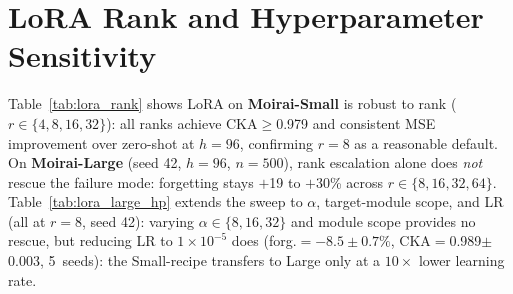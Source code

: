 \begin{table}[ht]
\centering
\caption{\textbf{Batch 3 of the pre-registered prospective test: the fitted
gate, graded on cells whose outcomes did not exist when it was frozen.}
gate$_\text{val}$ is the corrected selection-split ridge gate of
\S\ref{sec:forecasting}, frozen in the registration; ``pred.'' is the registered
gate rule at the $0.20$ operating point.  $\Delta_\text{FT}$ and
$\Delta_\text{frozen}$ are B$-$ZS and D$-$ZS in percent of zero-shot loss, with
$95\%$ intervals propagating the zero-shot reference's own error; ``Degr.?''
applies the registered interval rule.  The $\denc$ call is BH-adjusted within this
batch only.  A tenth registered cell (Moirai-Large/ETTm2 $h{=}96$, gate $-0.278$)
was deferred for the submission deadline and is disclosed in
Appendix~\ref{app:prospective3}.}
\label{tab:prospective3}

\end{table}

\section{LoRA Rank and Hyperparameter Sensitivity}
\label{app:lora_rank}

Table~\ref{tab:lora_rank} shows LoRA on \textbf{Moirai-Small} is robust to
rank ($r \in \{4, 8, 16, 32\}$): all ranks achieve CKA$\geq$0.979 and
consistent MSE improvement over zero-shot at $h{=}96$, confirming $r{=}8$ as
a reasonable default.
On \textbf{Moirai-Large} (seed 42, $h{=}96$, $n{=}500$), rank escalation
alone does \emph{not} rescue the failure mode: forgetting stays $+$19 to
$+$30\% across $r \in \{8, 16, 32, 64\}$.
Table~\ref{tab:lora_large_hp} extends the sweep to $\alpha$, target-module
scope, and LR (all at $r{=}8$, seed 42): varying $\alpha \in \{8,16,32\}$ and
module scope provides no rescue, but reducing LR to $1{\times}10^{-5}$ does
(forg.$=-8.5\pm0.7\%$, CKA$=$0.989$\pm$0.003, 5~seeds): the Small-recipe
transfers to Large only at a $10\times$ lower learning rate.

